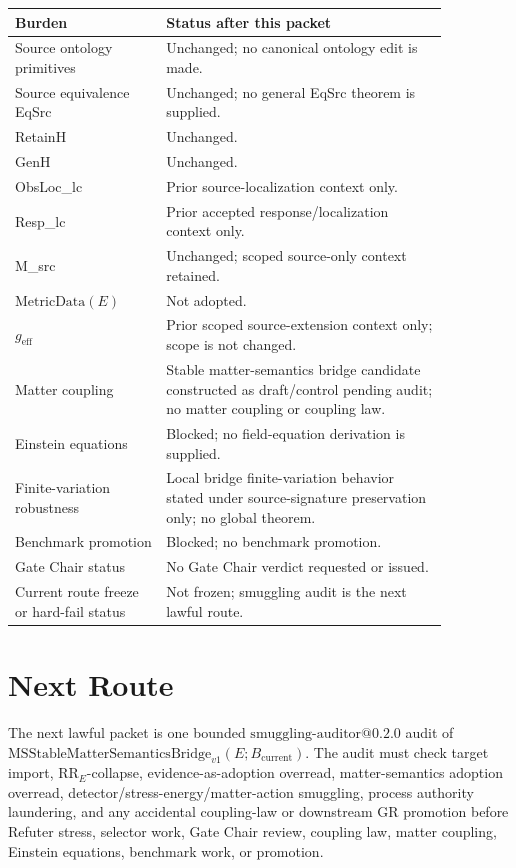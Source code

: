 \documentclass[11pt]{article}
\newcommand{\Bcur}{B_{\mathrm{current}}}
\newcommand{\MSBridge}{\mathrm{MSStableMatterSemanticsBridge}_{v1}}
\newcommand{\MetricData}{\mathrm{MetricData}}
\newcommand{\geff}{g_{\mathrm{eff}}}
\begin{document}
\begin{longtable}{p{0.30\linewidth}p{0.56\linewidth}}
\toprule
Burden & Status after this packet \\
\midrule
Source ontology primitives & Unchanged; no canonical ontology edit is made. \\
Source equivalence EqSrc & Unchanged; no general EqSrc theorem is supplied. \\
RetainH & Unchanged. \\
GenH & Unchanged. \\
ObsLoc\_lc & Prior source-localization context only. \\
Resp\_lc & Prior accepted response/localization context only. \\
M\_src & Unchanged; scoped source-only context retained. \\
\(\MetricData(E)\) & Not adopted. \\
\(\geff\) & Prior scoped source-extension context only; scope is not changed. \\
Matter coupling & Stable matter-semantics bridge candidate constructed as draft/control pending audit; no matter coupling or coupling law. \\
Einstein equations & Blocked; no field-equation derivation is supplied. \\
Finite-variation robustness & Local bridge finite-variation behavior stated under source-signature preservation only; no global theorem. \\
Benchmark promotion & Blocked; no benchmark promotion. \\
Gate Chair status & No Gate Chair verdict requested or issued. \\
Current route freeze or hard-fail status & Not frozen; smuggling audit is the next lawful route. \\
\bottomrule
\end{longtable}

\section{Next Route}

The next lawful packet is one bounded
\(\mathrm{smuggling\mbox{-}auditor@0.2.0}\) audit of
\(\MSBridge(E;\Bcur)\). The audit must check target import,
\(\mathrm{RR}_E\)-collapse, evidence-as-adoption overread, matter-semantics
adoption overread, detector/stress-energy/matter-action smuggling, process
authority laundering, and any accidental coupling-law or downstream GR
promotion before Refuter stress, selector work, Gate Chair review, coupling
law, matter coupling, Einstein equations, benchmark work, or promotion.
\end{document}
